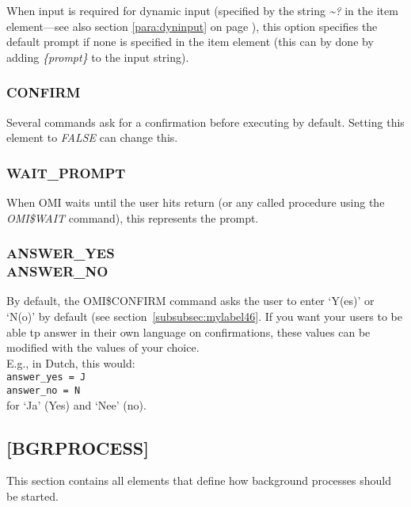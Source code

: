 \documentclass[a4paper]{book}
\renewcommand{\indent}{\hspace*{5mm}}
\begin{document}
When input is required for dynamic input (specified by the string \textsl{\~{}?} in the item 
element---see also section \ref{para:dyninput} on page \pageref{para:dyninput}),
this option specifies the default prompt if none is specified in 
the item element (this can by done by adding \textsl{{\{}\textit{prompt}{\}}} to the input string).

\subsubsection{CONFIRM}
\label{para:confirmput}

Several commands ask for a confirmation
before executing by default. Setting this element to \textsl{FALSE} can change this.

\subsubsection{WAIT{\_}PROMPT}

When OMI waits until the user hits return (or any called procedure using the 
\textsl{OMI{\$}WAIT} command), this 
represents the prompt.

\subsubsection{ANSWER{\_}YES\\ANSWER{\_}NO}

By default, the \textsf{OMI{\$}CONFIRM} command asks the user to enter `Y(es)' or `N(o)' by
default (see section~\ref{subsubsec:mylabel46}. If you want your users to be able tp
answer in their own language on confirmations, these values can be modified with the
values of your choice.\\
E.g., in Dutch, this would: \\
\indent\texttt{answer{\_}yes = J}\\
\indent\texttt{answer{\_}no = N}\\
for `Ja' (Yes) and `Nee' (no).

\subsection{[BGRPROCESS]}
\label{subsubsec:mylabel19}

This section contains all elements that define how background processes 
should be started.
\end{document}
